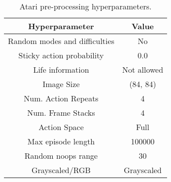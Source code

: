 \begin{table}[H]
\begin{center}
\caption{Atari pre-processing hyperparameters.}
\label{tab:ale_process}
\begin{tabular}{|c|c|}
\hline
\textbf{Hyperparameter} & \textbf{Value}  \\
\hline
Random modes and difficulties & No \\
\hline
Sticky action probability  & 0.0 \\
\hline
Life information & Not allowed \\
\hline
Image Size & (84, 84) \\
\hline
Num. Action Repeats & 4 \\
\hline
Num. Frame Stacks & 4 \\
\hline
Action Space & Full \\
\hline
Max episode length   & 100000 \\
\hline
Random noops range  & 30\\
\hline
Grayscaled/RGB      & Grayscaled\\
\hline
\end{tabular}

\end{center}
\end{table}
\clearpage

